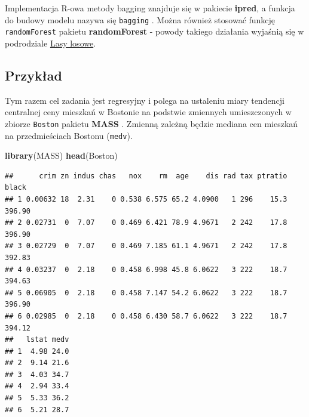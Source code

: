 \documentclass[]{book}
\newenvironment{Shaded}{\begin{snugshade}}{\end{snugshade}}
\newcommand{\DataTypeTok}[1]{\textcolor[rgb]{0.13,0.29,0.53}{#1}}
\newcommand{\DecValTok}[1]{\textcolor[rgb]{0.00,0.00,0.81}{#1}}
\newcommand{\KeywordTok}[1]{\textcolor[rgb]{0.13,0.29,0.53}{\textbf{#1}}}
\newcommand{\NormalTok}[1]{#1}
\newcommand{\OperatorTok}[1]{\textcolor[rgb]{0.81,0.36,0.00}{\textbf{#1}}}
\newcommand{\StringTok}[1]{\textcolor[rgb]{0.31,0.60,0.02}{#1}}
\theoremstyle{plain}
\theoremstyle{definition}
\begin{document}
Implementacja R-owa metody bagging znajduje się w pakiecie \textbf{ipred}, a funkcja do budowy modelu nazywa się \texttt{bagging} \citep{R-ipred}. Można również stosować funkcję \texttt{randomForest} pakietu \textbf{randomForest} \citep{R-las} - powody takiego działania wyjaśnią się w podrodziale \protect\hyperlink{lasy-losowe}{Lasy losowe}.

\hypertarget{przyk51}{%
\subsection{Przykład}\label{przyk51}}

Tym razem cel zadania jest regresyjny i polega na ustaleniu miary tendencji centralnej ceny mieszkań w Bostonie na podstwie zmiennych umieszczonych w zbiorze \texttt{Boston} pakietu \textbf{MASS} \citep{R-MASS}. Zmienną zależną będzie mediana cen mieszkań na przedmieściach Bostonu (\texttt{medv}).

\begin{Shaded}
\begin{Highlighting}[]
\KeywordTok{library}\NormalTok{(MASS)}
\KeywordTok{head}\NormalTok{(Boston)}
\end{Highlighting}
\end{Shaded}

\begin{verbatim}
##      crim zn indus chas   nox    rm  age    dis rad tax ptratio  black
## 1 0.00632 18  2.31    0 0.538 6.575 65.2 4.0900   1 296    15.3 396.90
## 2 0.02731  0  7.07    0 0.469 6.421 78.9 4.9671   2 242    17.8 396.90
## 3 0.02729  0  7.07    0 0.469 7.185 61.1 4.9671   2 242    17.8 392.83
## 4 0.03237  0  2.18    0 0.458 6.998 45.8 6.0622   3 222    18.7 394.63
## 5 0.06905  0  2.18    0 0.458 7.147 54.2 6.0622   3 222    18.7 396.90
## 6 0.02985  0  2.18    0 0.458 6.430 58.7 6.0622   3 222    18.7 394.12
##   lstat medv
## 1  4.98 24.0
## 2  9.14 21.6
## 3  4.03 34.7
## 4  2.94 33.4
## 5  5.33 36.2
## 6  5.21 28.7
\end{verbatim}

\begin{Shaded}
\end{Shaded}
\end{document}
